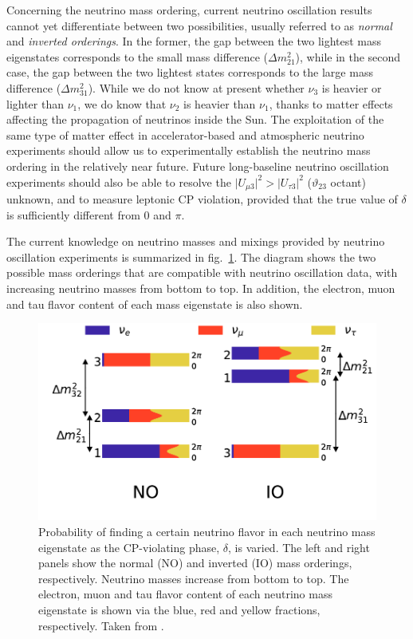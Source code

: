 Concerning the neutrino mass ordering, current neutrino oscillation results cannot yet differentiate between two possibilities, usually referred to as \emph{normal} and \emph{inverted orderings}. In the former, the gap between the two lightest mass eigenstates corresponds to the small mass difference ($\Delta m^2_{21}$), while in the second case, the gap between the two lightest states corresponds to the large mass difference ($\Delta m^2_{31}$). While we do not know at present whether $\nu_3$ is heavier or lighter than $\nu_1$, we do know that $\nu_2$ is heavier than $\nu_1$, thanks to matter effects affecting the propagation of neutrinos inside the Sun. The exploitation of the same type of matter effect in accelerator-based and atmospheric neutrino experiments should allow us to experimentally establish the neutrino mass ordering in the relatively near future. Future long-baseline neutrino oscillation experiments should also be able to resolve the $\lvert U_{\mu 3}\rvert^2 > \lvert U_{\tau 3}\rvert^2$ ($\vartheta_{23}$ octant) unknown, and to measure leptonic CP violation, provided that the true value of $\delta$ is sufficiently different from 0 and $\pi$. 

The current knowledge on neutrino masses and mixings provided by neutrino oscillation experiments is summarized in fig.~\ref{fig:numass_ordering}. The diagram shows the two possible mass orderings that are compatible with neutrino oscillation data, with increasing neutrino masses from bottom to top. In addition, the electron, muon and tau flavor content of each mass eigenstate is also shown.

\begin{figure}[t!b!]
\begin{center}
\includegraphics[width=\textwidth]{img/neutrinomassorderings.pdf}
\end{center}
\caption{Probability of finding a certain neutrino flavor in each neutrino mass eigenstate as the CP-violating phase, $\delta$, is
varied.  The left and right panels show the normal (NO) and inverted (IO) mass orderings, respectively. Neutrino masses increase from bottom to top. The electron, muon and tau flavor content of each neutrino mass eigenstate is shown via the blue, red and yellow fractions, respectively. Taken from \cite{DeSalas:2018rby}.}  \label{fig:numass_ordering}
\end{figure}

